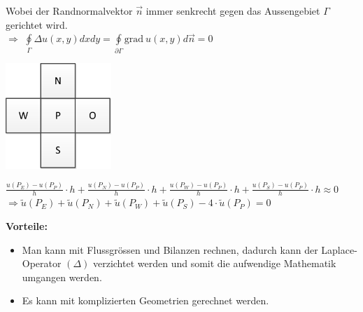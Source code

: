 Wobei der Randnormalvektor $\vec{n}$ immer senkrecht gegen das Aussengebiet $\Gamma$ gerichtet wird.\\

$\Rightarrow$ $\oint\limits_{\Gamma}{\Delta u(x,y) dx dy}=\oint\limits_{\partial\Gamma}{\mathrm{grad}~ u(x,y) d\vec{n}}=0$

\begin{minipage}{4cm}
	\includegraphics[width=4cm]{Content/Numerik/FVMPrinzip.png}
\end{minipage}
\hfill
\begin{minipage}{14cm}
	$\frac{u(P_E)-u(P_P)}{h}\cdot h+\frac{u(P_N)-u(P_P)}{h}\cdot h+\frac{u(P_W)-u(P_P)}{h}\cdot h+\frac{u(P_S)-u(P_P)}{h}\cdot h\approx 0$\\

	$\Rightarrow\tilde{u}(P_E)+\tilde{u}(P_N)+\tilde{u}(P_W)+\tilde{u}(P_S)-4\cdot\tilde{u}(P_P)=0$
\end{minipage}

\textbf{Vorteile:}\\
\begin{itemize}
\item Man kann mit Flussgrössen und Bilanzen rechnen, dadurch kann der
Laplace-Operator $(\Delta)$ verzichtet werden und somit die aufwendige Mathematik umgangen werden.
\item Es kann mit komplizierten Geometrien gerechnet werden.
\end{itemize}


